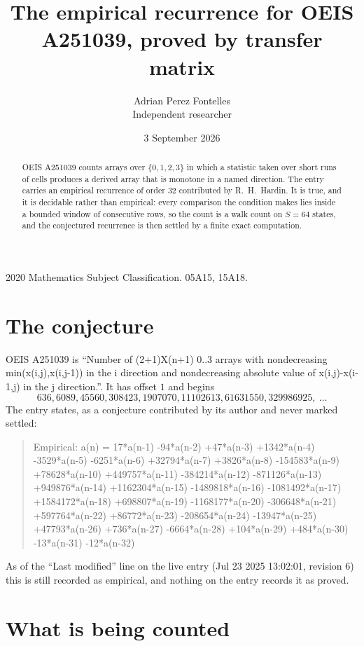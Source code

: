 \documentclass[11pt,a4paper]{article}
\title{The empirical recurrence for OEIS A251039, proved by transfer matrix}
\author{Adrian Perez Fontelles\\ \small Independent researcher}
\date{3 September 2026}
\theoremstyle{plain}
\theoremstyle{definition}
\begin{document}
\maketitle

\begin{abstract}
OEIS A251039 counts arrays over $\{0,1,2,3\}$ in which a statistic taken over short runs
of cells produces a derived array that is monotone in a named direction. The entry carries an
empirical recurrence of order $32$ contributed by R.~H.~Hardin. It is true, and it is
decidable rather than empirical: every comparison the condition makes lies inside a bounded
window of consecutive rows, so the count is a walk count on $S=64$ states, and the
conjectured recurrence is then settled by a finite exact computation.
\end{abstract}

\noindent\small 2020 Mathematics Subject Classification. 05A15, 15A18.\normalsize

\section{The conjecture}

OEIS A251039 is ``Number of (2+1)X(n+1) 0..3 arrays with nondecreasing min(x(i,j),x(i,j-1)) in the i direction and nondecreasing absolute value of x(i,j)-x(i-1,j) in the j direction.''. It has offset $1$ and begins
\[
636, 6089, 45560, 308423, 1907070, 11102613, 61631550, 329986925,\ \dots
\]
The entry states, as a conjecture contributed by its author and never marked settled:
\begin{quote}
Empirical: a(n) = 17*a(n-1) -94*a(n-2) +47*a(n-3) +1342*a(n-4) -3529*a(n-5) -6251*a(n-6) +32794*a(n-7) +3826*a(n-8) -154583*a(n-9) +78628*a(n-10) +449757*a(n-11) -384214*a(n-12) -871126*a(n-13) +949876*a(n-14) +1162304*a(n-15) -1489818*a(n-16) -1081492*a(n-17) +1584172*a(n-18) +698807*a(n-19) -1168177*a(n-20) -306648*a(n-21) +597764*a(n-22) +86772*a(n-23) -208654*a(n-24) -13947*a(n-25) +47793*a(n-26) +736*a(n-27) -6664*a(n-28) +104*a(n-29) +484*a(n-30) -13*a(n-31) -12*a(n-32)
\end{quote}
As of the ``Last modified'' line on the live entry (Jul 23 2025 13:02:01, revision 6) this is still
recorded as empirical, and nothing on the entry records it as proved.

\section{What is being counted}
\end{document}
